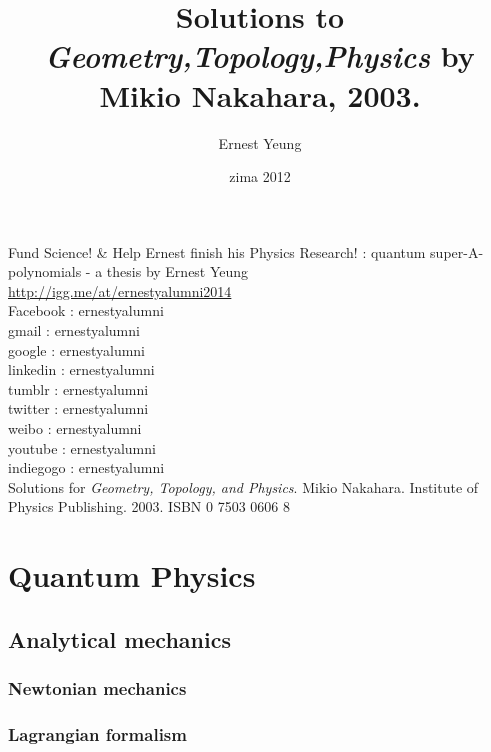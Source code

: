 \documentclass[twoside]{amsart}
\title{
Solutions to \emph{Geometry,Topology,Physics} by Mikio Nakahara, 2003.  
}
\author{
  Ernest Yeung
       }
\date{zima 2012}
\begin{document}

\maketitle

Fund Science! \& Help Ernest finish his Physics Research! : quantum super-A-polynomials - a thesis by Ernest Yeung \\

\url{http://igg.me/at/ernestyalumni2014} \\

\noindent Facebook  : ernestyalumni \\
gmail        : ernestyalumni \\
google       : ernestyalumni \\
linkedin     : ernestyalumni \\
tumblr       : ernestyalumni \\
twitter      : ernestyalumni \\
weibo        : ernestyalumni \\ 
youtube      : ernestyalumni \\
indiegogo    : ernestyalumni \\


Solutions for \emph{Geometry, Topology, and Physics}.  Mikio Nakahara.  Institute of Physics Publishing.  2003.  ISBN 0 7503 0606 8

\section{Quantum Physics}

\subsection{Analytical mechanics}

\subsubsection{Newtonian mechanics}

\subsubsection{Lagrangian formalism}
\end{document}

